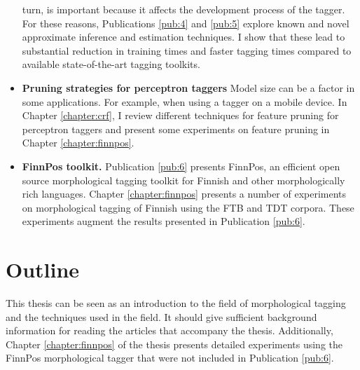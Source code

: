 \begin{itemize}
  turn, is important because it affects the development process of the
  tagger. For these reasons, Publications \ref{pub:4} and \ref{pub:5}
  explore known and novel approximate inference and estimation
  techniques. I show that these lead to substantial reduction in
  training times and faster tagging times compared to available
  state-of-the-art tagging toolkits.
\item {\bf Pruning strategies for perceptron taggers} Model size can
  be a factor in some applications. For example, when using a tagger
  on a mobile device. In Chapter \ref{chapter:crf}, I review different
  techniques for feature pruning for perceptron taggers and present
  some experiments on feature pruning in Chapter
  \ref{chapter:finnpos}.
\item {\bf FinnPos toolkit.} Publication \ref{pub:6} presents FinnPos,
  an efficient open source morphological tagging toolkit for Finnish
  and other morphologically rich languages. Chapter
  \ref{chapter:finnpos} presents a number of experiments on
  morphological tagging of Finnish using the FTB and TDT
  corpora. These experiments augment the results presented in
  Publication \ref{pub:6}.
\end{itemize}


\section{Outline}
This thesis can be seen as an introduction to the field of
morphological tagging and the techniques used in the field. It should
give sufficient background information for reading the articles that
accompany the thesis. Additionally, Chapter \ref{chapter:finnpos} of
the thesis presents detailed experiments using the FinnPos
morphological tagger that were not included in Publication
\ref{pub:6}.

